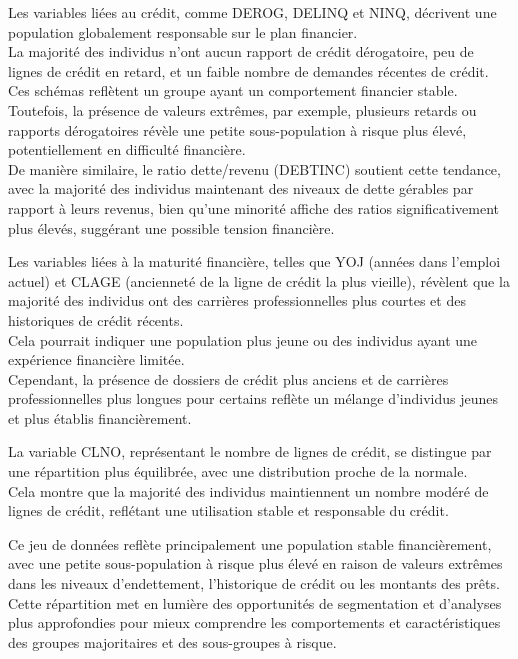 \documentclass[a4paper,12pt]{report}
\begin{document}
\bigbreak

Les variables liées au crédit, comme DEROG, DELINQ et NINQ, décrivent une population globalement responsable sur le plan financier.\\
La majorité des individus n’ont aucun rapport de crédit dérogatoire, peu de lignes de crédit en retard, et un faible nombre de demandes récentes de crédit.\\
Ces schémas reflètent un groupe ayant un comportement financier stable.
Toutefois, la présence de valeurs extrêmes, par exemple, plusieurs retards ou rapports dérogatoires révèle une petite sous-population à risque plus élevé, potentiellement en difficulté financière.\\
De manière similaire, le ratio dette/revenu (DEBTINC) soutient cette tendance, avec la majorité des individus maintenant des niveaux de dette gérables par rapport à leurs revenus, bien qu’une minorité affiche des ratios significativement plus élevés, suggérant une possible tension financière.

\bigbreak

Les variables liées à la maturité financière, telles que YOJ (années dans l’emploi actuel) et CLAGE (ancienneté de la ligne de crédit la plus vieille), révèlent que la majorité des individus ont des carrières professionnelles plus courtes et des historiques de crédit récents. \\
Cela pourrait indiquer une population plus jeune ou des individus ayant une expérience financière limitée.\\
Cependant, la présence de dossiers de crédit plus anciens et de carrières professionnelles plus longues pour certains reflète un mélange d’individus jeunes et plus établis financièrement.

\bigbreak

La variable CLNO, représentant le nombre de lignes de crédit, se distingue par une répartition plus équilibrée, avec une distribution proche de la normale.\\
Cela montre que la majorité des individus maintiennent un nombre modéré de lignes de crédit, reflétant une utilisation stable et responsable du crédit.

\bigbreak

Ce jeu de données reflète principalement une population stable financièrement, avec une petite sous-population à risque plus élevé en raison de valeurs extrêmes dans les niveaux d’endettement, l’historique de crédit ou les montants des prêts.\\
Cette répartition met en lumière des opportunités de segmentation et d’analyses plus approfondies pour mieux comprendre les comportements et caractéristiques des groupes majoritaires et des sous-groupes à risque.
\end{document}
